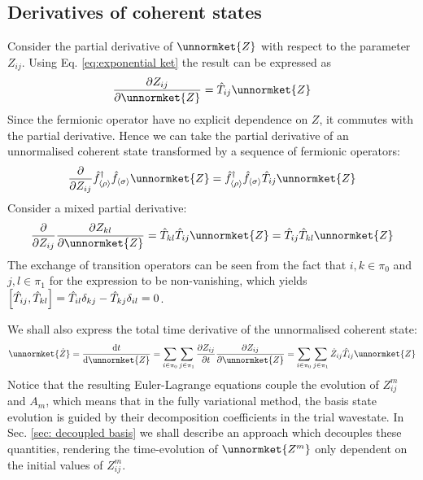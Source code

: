 \documentclass[12pt]{article}
\newcommand{\seq}[1]{\langle #1\rangle}
\newcommand{\hc}{^\dagger}
\begin{document}
	\subsection{Derivatives of coherent states}
	Consider the partial derivative of $\unnormket{Z}$ with respect to the parameter $Z_{ij}$. Using Eq. \ref{eq:exponential ket} the result can be expressed as
	\begin{equation}
	\pdv{Z_{ij}}\unnormket{Z}=\hat{T}_{ij}\unnormket{Z}
	\end{equation}
	Since the fermionic operator have no explicit dependence on $Z$, it commutes with the partial derivative. Hence we can take the partial derivative of an unnormalised coherent state transformed by a sequence of fermionic operators:
	\begin{equation}
	\pdv{Z_{ij}}\hat{f}\hc_{\seq{\rho}}\hat{f}_{\seq{\sigma}}\unnormket{Z}=\hat{f}\hc_{\seq{\rho}}\hat{f}_{\seq{\sigma}}\hat{T}_{ij}\unnormket{Z}
	\end{equation}
	Consider a mixed partial derivative:
	\begin{equation}
	\pdv{Z_{ij}}\pdv{Z_{kl}}\unnormket{Z}=\hat{T}_{kl}\hat{T}_{ij}\unnormket{Z}=\hat{T}_{ij}\hat{T}_{kl}\unnormket{Z}
	\end{equation}
	 The exchange of transition operators can be seen from the fact that $i,k\in\pi_0$ and $j,l\in\pi_1$ for the expression to be non-vanishing, which yields $\comm{\hat{T}_{ij}}{\hat{T}_{kl}}=\hat{T}_{il}\delta_{kj}-\hat{T}_{kj}\delta_{il}=0$.
	 
	 We shall also express the total time derivative of the unnormalised coherent state:
	 \begin{equation}
	 \unnormket{\dot{Z}}=\dv{t}\unnormket{Z}=\sum_{i\in\pi_0}\sum_{j\in\pi_1}\pdv{Z_{ij}}{t}\pdv{Z_{ij}}\unnormket{Z}=\sum_{i\in\pi_0}\sum_{j\in\pi_1}\dot{Z}_{ij}\hat{T}_{ij}\unnormket{Z}
	 \end{equation}
	 Notice that the resulting Euler-Lagrange equations couple the evolution of $Z^m_{ij}$ and $A_m$, which means that in the fully variational method, the basis state evolution is guided by their decomposition coefficients in the trial wavestate. In Sec. \ref{sec: decoupled basis} we shall describe an approach which decouples these quantities, rendering the time-evolution of $\unnormket{Z^m}$ only dependent on the initial values of $Z^m_{ij}$.
	
\end{document}
